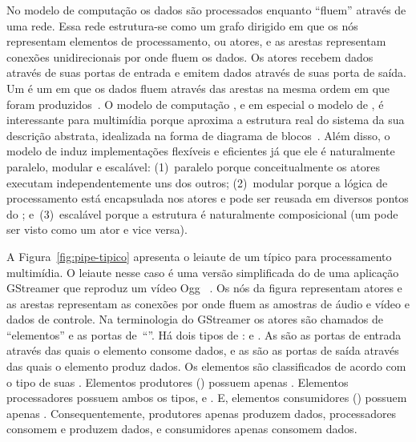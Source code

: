 \documentclass{SBCbookchapter}
\begin{document}
No modelo de computação  os dados são processados enquanto
``fluem'' através de uma rede.  Essa rede estrutura-se como um grafo
dirigido em que os nós representam elementos de processamento, ou atores, e
as arestas representam conexões unidirecionais por onde fluem os dados.  Os
atores recebem dados através de suas portas de entrada e emitem dados
através de suas porta de saída.  Um  é um  em que
os dados fluem através das arestas na mesma ordem em que foram
produzidos~\cite{Kahn-G-1977,Lee-E-A-1995}.  O modelo de computação
, e em especial o modelo de , é interessante para
multimídia porque aproxima a estrutura real do sistema da sua descrição
abstrata, idealizada na forma de diagrama de blocos~\cite{Yviquel-H-2014}.
Além disso, o modelo de  induz implementações flexíveis e
eficientes já que ele é naturalmente paralelo, modular e escalável:
(1)~paralelo porque conceitualmente os atores executam independentemente uns
dos outros; (2)~modular porque a lógica de processamento está encapsulada
nos atores e pode ser reusada em diversos pontos do ;
e~(3)~escalável porque a estrutura é naturalmente composicional (um
 pode ser visto como um ator e vice versa).

A Figura~\ref{fig:pipe-tipico} apresenta o leiaute de um 
típico para processamento multimídia.  O leiaute nesse caso é uma versão
simplificada do  de uma aplicação GStreamer que reproduz um
vídeo Ogg~\cite{ogg-rfc-3533} .  Os nós da figura representam atores e as
arestas representam as conexões por onde fluem as amostras de áudio e vídeo
e dados de controle.  Na terminologia do GStreamer os atores são chamados de
``elementos'' e as portas de~``''.  Há dois tipos de :
 e .  As  são as portas de
entrada através das quais o elemento consome dados, e as 
são as portas de saída através das quais o elemento produz dados.  Os
elementos são classificados de acordo com o tipo de suas .
Elementos produtores () possuem apenas .
Elementos processadores possuem ambos os tipos,  e .  E, elementos consumidores () possuem apenas .  Consequentemente, produtores apenas produzem dados, processadores
consomem e produzem dados, e consumidores apenas consomem dados.
\end{document}
